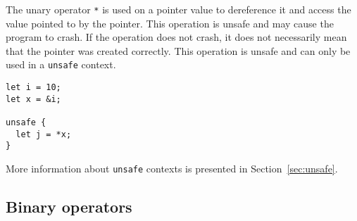 The unary operator \texttt{*} is used on a pointer value to dereference it and
access the value pointed to by the pointer. This operation is unsafe and may
cause the program to crash. If the operation does not crash, it does not
necessarily mean that the pointer was created correctly. This operation is
unsafe and can only be used in a \texttt{unsafe} context.
\smallskip

\begin{lstlisting}[style=coloredverbatim]
let i = 10;
let x = &i;

unsafe {
  let j = *x;
}
\end{lstlisting}

More information about \texttt{unsafe} contexts is presented in
Section~\ref{sec:unsafe}.

\subsection {Binary operators}

